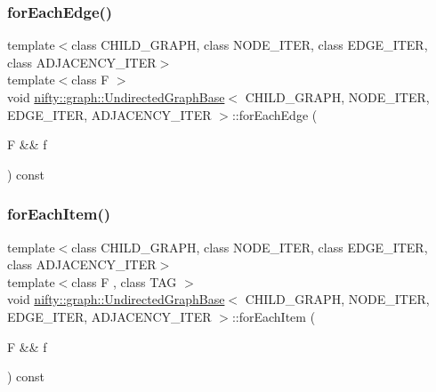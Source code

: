 \mbox{\label{classnifty_1_1graph_1_1UndirectedGraphBase_a8c3d0036b084ef7463544b822835d446}} 
\subsubsection{\texorpdfstring{for\+Each\+Edge()}{forEachEdge()}}
{\footnotesize\ttfamily template$<$class C\+H\+I\+L\+D\+\_\+\+G\+R\+A\+PH, class N\+O\+D\+E\+\_\+\+I\+T\+ER, class E\+D\+G\+E\+\_\+\+I\+T\+ER, class A\+D\+J\+A\+C\+E\+N\+C\+Y\+\_\+\+I\+T\+ER$>$ \\
template$<$class F $>$ \\
void \hyperlink{classnifty_1_1graph_1_1UndirectedGraphBase}{nifty\+::graph\+::\+Undirected\+Graph\+Base}$<$ C\+H\+I\+L\+D\+\_\+\+G\+R\+A\+PH, N\+O\+D\+E\+\_\+\+I\+T\+ER, E\+D\+G\+E\+\_\+\+I\+T\+ER, A\+D\+J\+A\+C\+E\+N\+C\+Y\+\_\+\+I\+T\+ER $>$\+::for\+Each\+Edge (\begin{DoxyParamCaption}\item[{F \&\&}]{f }\end{DoxyParamCaption}) const\hspace{0.3cm}{\ttfamily [inline]}}

\mbox{\label{classnifty_1_1graph_1_1UndirectedGraphBase_acfc8a7b6851e1ae726211911d84d309a}} 
\subsubsection{\texorpdfstring{for\+Each\+Item()}{forEachItem()}}
{\footnotesize\ttfamily template$<$class C\+H\+I\+L\+D\+\_\+\+G\+R\+A\+PH, class N\+O\+D\+E\+\_\+\+I\+T\+ER, class E\+D\+G\+E\+\_\+\+I\+T\+ER, class A\+D\+J\+A\+C\+E\+N\+C\+Y\+\_\+\+I\+T\+ER$>$ \\
template$<$class F , class T\+AG $>$ \\
void \hyperlink{classnifty_1_1graph_1_1UndirectedGraphBase}{nifty\+::graph\+::\+Undirected\+Graph\+Base}$<$ C\+H\+I\+L\+D\+\_\+\+G\+R\+A\+PH, N\+O\+D\+E\+\_\+\+I\+T\+ER, E\+D\+G\+E\+\_\+\+I\+T\+ER, A\+D\+J\+A\+C\+E\+N\+C\+Y\+\_\+\+I\+T\+ER $>$\+::for\+Each\+Item (\begin{DoxyParamCaption}\item[{F \&\&}]{f }\end{DoxyParamCaption}) const\hspace{0.3cm}{\ttfamily [inline]}}


